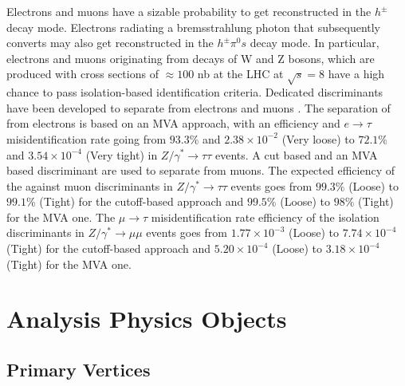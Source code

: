 Electrons and muons have a sizable probability to get reconstructed in the \ensuremath{h^{\pm}} decay mode. Electrons radiating a bremsstrahlung photon that subsequently converts may also get reconstructed in the \ensuremath{h^{\pm}\pi^{0}s} decay mode. In particular, electrons and muons originating from decays of W and Z bosons, which are produced with cross sections of \ensuremath{\approx100} nb at the LHC at \ensuremath{\sqrt{s} = 8} \tev have a high chance to pass isolation-based \hadtau identification criteria. Dedicated discriminants have been developed to separate \hadtau from electrons and muons \cite{Khachatryan:2015dfa}. The separation of \hadtau from electrons is based on an MVA approach, with an efficiency and \ensuremath{e\to \tau} misidentification rate going from \ensuremath{93.3\%} and \ensuremath{2.38 \times 10^{−2}} (Very loose) to \ensuremath{72.1\%} and \ensuremath{3.54 \times 10^{−4}} (Very tight) in \ensuremath{Z/\gamma^{*} \longrightarrow \tau\tau} events.
A cut based and an MVA based discriminant are used to separate \hadtau from muons. The expected efficiency of the \hadtau against muon discriminants in \ensuremath{Z/\gamma^{*} \longrightarrow \tau\tau} events goes from \ensuremath{99.3\%} (Loose) to \ensuremath{99.1}\% (Tight) for the cutoff-based approach and \ensuremath{99.5\%} (Loose) to \ensuremath{98\%} (Tight) for the MVA one. The \ensuremath{\mu \to \tau} misidentification rate efficiency of the \hadtau isolation discriminants in \ensuremath{Z/\gamma^{*} \longrightarrow \mu\mu} events goes from \ensuremath{1.77 \times 10^{−3}} (Loose) to \ensuremath{7.74 \times 10^{-4}} (Tight) for the cutoff-based approach and \ensuremath{5.20 \times 10^{−4}} (Loose) to \ensuremath{3.18 \times 10^{−4}} (Tight) for the MVA one.

\section {Analysis Physics Objects}

\subsection{Primary Vertices}
\label{subsec::objsel_vertex}


